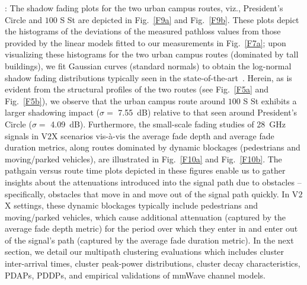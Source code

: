 \documentclass[12pt, draftcls, onecolumn]{IEEEtran}
\begin{document}
{: The shadow fading plots for the two urban campus routes, viz., President's Circle and $100$ S St are depicted in Fig.~\ref{F9a} and Fig.~\ref{F9b}. These plots depict the histograms of the deviations of the measured pathloss values from those provided by the linear models fitted to our measurements in Fig.~\ref{F7a}; upon visualizing these histograms for the two urban campus routes (dominated by tall buildings), we fit Gaussian curves (standard normals) to obtain the log-normal shadow fading distributions typically seen in the state-of-the-art~\cite{DopplerHST}. Herein, as is evident from the structural profiles of the two routes (see Fig.~\ref{F5a} and Fig.~\ref{F5b}), we observe that the urban campus route around $100$ S St exhibits a larger shadowing impact ($\sigma = $ \SI{7.55}{\deci\bel}) relative to that seen around President's Circle ($\sigma = $ \SI{4.09}{\deci\bel}). Furthermore, the small-scale fading studies of \SI{28}{\giga\hertz} signals in V$2$X scenarios vis-à-vis the average fade depth and average fade duration metrics, along routes dominated by dynamic blockages (pedestrians and moving/parked vehicles), are illustrated in Fig.~\ref{F10a} and Fig.~\ref{F10b}. The pathgain versus route time plots depicted in these figures enable us to gather insights about the attenuations introduced into the signal path due to obstacles -- specifically, obstacles that move in and move out of the signal path quickly. In V$2$X settings, these dynamic blockages typically include pedestrians and moving/parked vehicles, which cause additional attenuation (captured by the average fade depth metric) for the period over which they enter in and enter out of the signal's path (captured by the average fade duration metric). In the next section, we detail our multipath clustering evaluations which includes cluster inter-arrival times, cluster peak-power distributions, cluster decay characteristics, PDAPs, PDDPs, and empirical validations of mmWave channel models.
\begin{figure} [t]
    \centering
    \begin{subfigure}{0.482\linewidth}
        \centering

\end{subfigure}
\end{figure}}
\end{document}
